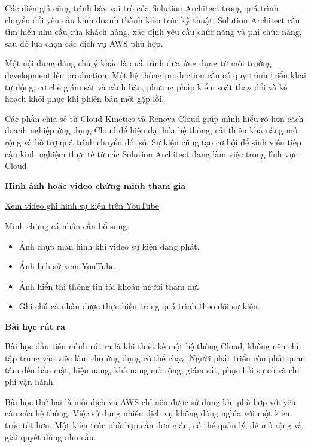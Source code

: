 Các diễn giả cũng trình bày vai trò của Solution Architect trong quá
trình chuyển đổi yêu cầu kinh doanh thành kiến trúc kỹ thuật. Solution
Architect cần tìm hiểu nhu cầu của khách hàng, xác định yêu cầu chức
năng và phi chức năng, sau đó lựa chọn các dịch vụ AWS phù hợp.

Một nội dung đáng chú ý khác là quá trình đưa ứng dụng từ môi trường
development lên production. Một hệ thống production cần có quy trình
triển khai tự động, cơ chế giám sát và cảnh báo, phương pháp kiểm soát
thay đổi và kế hoạch khôi phục khi phiên bản mới gặp lỗi.

Các phần chia sẻ từ Cloud Kinetics và Renova Cloud giúp mình hiểu rõ hơn
cách doanh nghiệp ứng dụng Cloud để hiện đại hóa hệ thống, cải thiện khả
năng mở rộng và hỗ trợ quá trình chuyển đổi số. Sự kiện cũng tạo cơ hội
để sinh viên tiếp cận kinh nghiệm thực tế từ các Solution Architect đang
làm việc trong lĩnh vực Cloud.

\vspace{0.5em}\noindent\textbf{Hình ảnh hoặc video chứng minh tham
gia}\par

\href{https://www.youtube.com/live/FKtMkUqyny4?si=SdhD3d67wFy7qNr6}{Xem
video ghi hình sự kiện trên YouTube}

Minh chứng cá nhân cần bổ sung:

\begin{itemize}
\tightlist
\item
  Ảnh chụp màn hình khi video sự kiện đang phát.
\item
  Ảnh lịch sử xem YouTube.
\item
  Ảnh hiển thị thông tin tài khoản người tham dự.
\item
  Ghi chú cá nhân được thực hiện trong quá trình theo dõi sự kiện.
\end{itemize}

\vspace{0.5em}\noindent\textbf{Bài học rút ra}\par

Bài học đầu tiên mình rút ra là khi thiết kế một hệ thống Cloud, không
nên chỉ tập trung vào việc làm cho ứng dụng có thể chạy. Người phát
triển còn phải quan tâm đến bảo mật, hiệu năng, khả năng mở rộng, giám
sát, phục hồi sự cố và chi phí vận hành.

Bài học thứ hai là mỗi dịch vụ AWS chỉ nên được sử dụng khi phù hợp với
yêu cầu của hệ thống. Việc sử dụng nhiều dịch vụ không đồng nghĩa với
một kiến trúc tốt hơn. Một kiến trúc phù hợp cần đơn giản, có thể quản
lý, dễ mở rộng và giải quyết đúng nhu cầu.

